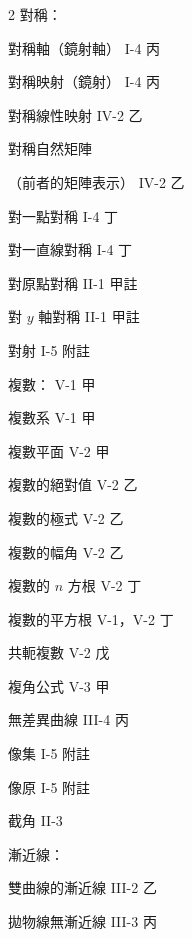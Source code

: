 \begin{multicols}{2}
\noindent 對稱：\par
\noindent\hspace*{1.5em} 對稱軸（鏡射軸） \hfill I-4 丙\par
\noindent\hspace*{1.5em} 對稱映射（鏡射） \hfill I-4 丙\par
\noindent\hspace*{1.5em} 對稱線性映射 \hfill IV-2 乙\par
\noindent\hspace*{1.5em} 對稱自然矩陣\par
\noindent\hspace*{1.5em} （前者的矩陣表示） \hfill IV-2 乙\par
\noindent\hspace*{1.5em} 對一點對稱 \hfill I-4 丁\par
\noindent\hspace*{1.5em} 對一直線對稱 \hfill I-4 丁\par
\noindent\hspace*{1.5em} 對原點對稱 \hfill II-1 甲註\par
\noindent\hspace*{1.5em} 對 $y$ 軸對稱 \hfill II-1 甲註\par
\noindent 對射 \hfill I-5 附註\par
\noindent 複數： \hfill V-1 甲\par
\noindent\hspace*{1.5em} 複數系 \hfill V-1 甲\par
\noindent\hspace*{1.5em} 複數平面 \hfill V-2 甲\par
\noindent\hspace*{1.5em} 複數的絕對值 \hfill V-2 乙\par
\noindent\hspace*{1.5em} 複數的極式 \hfill V-2 乙\par
\noindent\hspace*{1.5em} 複數的幅角 \hfill V-2 乙\par
\noindent\hspace*{1.5em} 複數的 $n$ 方根 \hfill V-2 丁\par
\noindent\hspace*{1.5em} 複數的平方根 \hfill V-1，V-2 丁\par
\noindent\hspace*{1.5em} 共軛複數 \hfill V-2 戊\par
\noindent 複角公式 \hfill V-3 甲\par
\noindent 無差異曲線 \hfill III-4 丙\par
\noindent 像集 \hfill I-5 附註\par
\noindent 像原 \hfill I-5 附註\par
\noindent 截角 \hfill II-3\par
\noindent 漸近線：\par
\noindent\hspace*{1.5em} 雙曲線的漸近線 \hfill III-2 乙\par
\noindent\hspace*{1.5em} 拋物線無漸近線 \hfill III-3 丙\par


\end{multicols}
